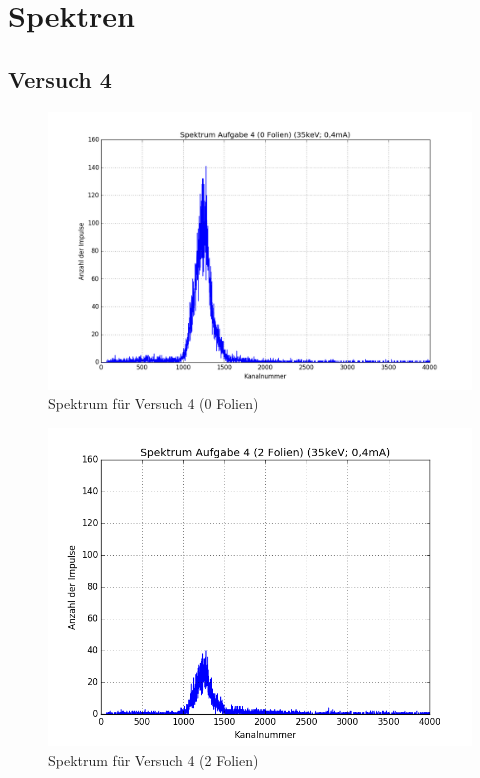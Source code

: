 \section{Spektren}

\subsection{Versuch 4}

\begin{figure}[h]
 \centering
 \includegraphics[scale=0.5]{./fig/a4_spec0.png}
 \caption{Spektrum für Versuch 4 (0 Folien)}
 \label{fig:spek40}
\end{figure}

\begin{figure}[h]
 \centering
 \includegraphics[scale=0.7]{./fig/a4_spec2.png}
 \caption{Spektrum für Versuch 4 (2 Folien)}
 \label{fig:spek42}
\end{figure}

